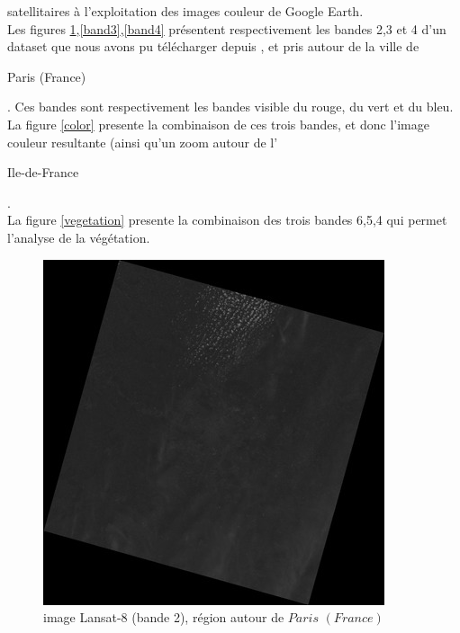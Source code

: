 \documentclass{book}
\begin{document}
satellitaires à l'exploitation des images couleur de Google Earth.\\
Les figures \ref{band2},\ref{band3},\ref{band4} présentent respectivement les bandes 2,3 et 4 d'un dataset que nous
avons pu télécharger depuis \cite{landsat8}, et pris autour de la ville
de \begin{itshape}Paris (France)\end{itshape}. Ces bandes sont respectivement les bandes visible du rouge, du vert et du bleu.\\
La figure \ref{color} presente la combinaison de ces trois bandes, et donc l'image couleur resultante (ainsi qu'un zoom autour de l'\begin{itshape}Ile-de-France\end{itshape}.\\
La figure \ref{vegetation} presente la combinaison des trois bandes 6,5,4 qui permet l'analyse de la végétation.\\

\begin{figure}[H]
\begin{center}
\includegraphics[scale=0.8]{LC81990262015158LGN00_B2r.jpg}
\end{center}
\caption{image Lansat-8 (bande 2), région autour de $Paris$ $(France)$}
\label{band2}
\end{figure}
\end{document}
